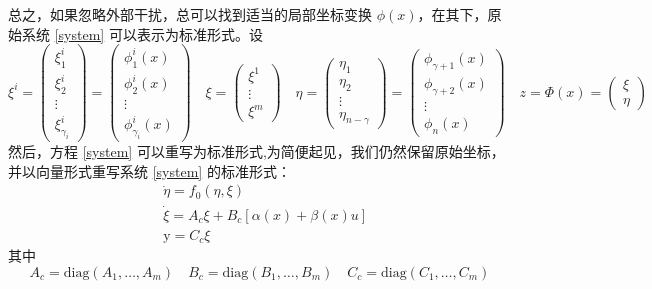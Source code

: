 \begin{ubox}
  总之，如果忽略外部干扰，总可以找到适当的局部坐标变换 $\phi(x)$，在其下，原始系统 \eqref{system} 可以表示为标准形式。设 
  \begin{equation}
	\xi^i=\begin{pmatrix}\xi_1^i\\\xi_2^i\\\vdots\\\xi_{\gamma_i}^i\end{pmatrix}=\begin{pmatrix}\phi_1^i(x)\\\phi_2^i(x)\\\vdots\\\phi_{\gamma_i}^i(x)\end{pmatrix} \quad  
	  \xi=\begin{pmatrix}\xi^1 \\ \vdots \\ \xi^m\end{pmatrix} \quad  
	  \eta=\begin{pmatrix}\eta_1\\\eta_2\\\vdots\\\eta_{n-\gamma}\end{pmatrix}=\begin{pmatrix}\phi_{\gamma+1}(x)\\\phi_{\gamma+2}(x)\\\vdots\\\phi_n(x)\end{pmatrix} \quad   
	  z=\Phi(x)=\begin{pmatrix}\xi\\\eta\end{pmatrix}
	  \label{stran}
  \end{equation}
  然后，方程 \eqref{system} 可以重写为标准形式,为简便起见，我们仍然保留原始坐标，并以向量形式重写系统 \eqref{system} 的标准形式：
  \begin{equation}
	\begin{aligned}&\dot{\eta}= f_{0}(\eta,\xi)\\&\dot{\xi}= A_{c}\xi+B_{c}[\alpha(x)+\beta(x)u]\\&\text{y}= C_{c}\xi\end{aligned}
  \end{equation}
  其中 
  \begin{equation}
	A_c=\mathrm{diag}(A_{1},\ldots,A_{m})\quad B_c=\mathrm{diag}(B_{1},\ldots,B_{m})\quad C_c=\mathrm{diag}(C_{1},\ldots,C_{m})

\end{equation}
\end{ubox}
